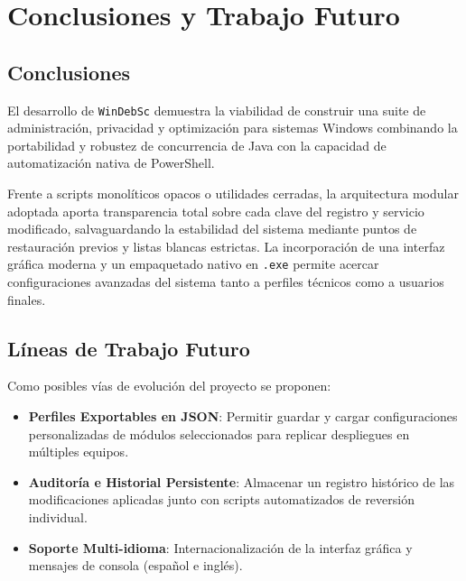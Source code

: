 \documentclass[12pt,a4paper]{report}
\begin{document}
\chapter{Conclusiones y Trabajo Futuro}
\section{Conclusiones}
El desarrollo de \texttt{WinDebSc} demuestra la viabilidad de construir una suite de administración, privacidad y optimización para sistemas Windows combinando la portabilidad y robustez de concurrencia de Java con la capacidad de automatización nativa de PowerShell.

Frente a scripts monolíticos opacos o utilidades cerradas, la arquitectura modular adoptada aporta transparencia total sobre cada clave del registro y servicio modificado, salvaguardando la estabilidad del sistema mediante puntos de restauración previos y listas blancas estrictas. La incorporación de una interfaz gráfica moderna y un empaquetado nativo en \texttt{.exe} permite acercar configuraciones avanzadas del sistema tanto a perfiles técnicos como a usuarios finales.

\section{Líneas de Trabajo Futuro}
Como posibles vías de evolución del proyecto se proponen:
\begin{itemize}
    \item \textbf{Perfiles Exportables en JSON}: Permitir guardar y cargar configuraciones personalizadas de módulos seleccionados para replicar despliegues en múltiples equipos.
    \item \textbf{Auditoría e Historial Persistente}: Almacenar un registro histórico de las modificaciones aplicadas junto con scripts automatizados de reversión individual.
    \item \textbf{Soporte Multi-idioma}: Internacionalización de la interfaz gráfica y mensajes de consola (español e inglés).
\end{itemize}
\end{document}
